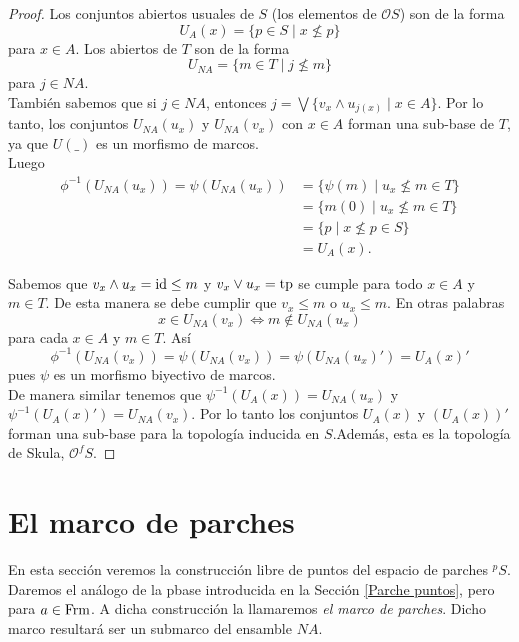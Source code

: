 \begin{proof}
    Los conjuntos abiertos usuales de $S$ (los elementos de $\mathcal{O}S$) son de la forma
    \[
    U_A(x)=\{p\in S\mid x\nleq p\}
    \]
    para $x\in A$. Los abiertos de $T$ son de la forma 
    \[
    U_{NA}=\{m\in T\mid j\nleq m\}
    \]
    para $j\in NA$.\\

    También sabemos que si $j\in NA$, entonces $j=\bigvee\{v_x\wedge u_{j(x)}\mid x\in A\}$. Por lo tanto, los conjuntos $U_{NA}(u_x)$ y $U_{NA}(v_x)$ con $x\in A$ forman una sub-base de $T$, ya que $U( \_ )$ es un morfismo de marcos.\\

    Luego
    \[
    \begin{split}
        \phi^{-1}(U_{NA}(u_x))=\psi (U_{NA}(u_x))&=\{\psi (m)\mid u_x\nleq m \in T\}\\
        &=\{m(0)\mid u_x\nleq m\in T\}\\
        &=\{p\mid x\nleq p\in S\}\\
        &=U_A(x).
    \end{split}
    \]

    Sabemos que $v_x\wedge u_x=\mathrm{id}\leq m$ y $v_x\vee u_x=\mathrm{tp}$ se cumple para todo $x\in A$ y $m\in T$. De esta manera se debe cumplir que $v_x\leq m$ o $u_x\leq m$. En otras palabras
    \[
    x\in U_{NA}(v_x)\Leftrightarrow m\notin U_{NA}(u_x)
    \]
    para cada $x\in A$ y $m\in T$. Así
    \[
    \phi^{-1}(U_{NA}(v_x))=\psi (U_{NA}(v_x))=\psi(U_{NA}(u_x)')=U_A(x)'
    \]
    pues $\psi$ es un morfismo biyectivo de marcos.\\

    De manera similar tenemos que $\psi^{-1}(U_A(x))=U_{NA}(u_x)$ y $\psi^{-1}(U_A(x)')=U_{NA}(v_x)$. Por lo tanto los conjuntos $U_A(x)$ y $(U_A(x))'$ forman una sub-base para la topología inducida en $S$.Además, esta es la topología de Skula, $\mathcal{O}^fS$.
\end{proof}

\section{El marco de parches}\label{Marco de parche}

En esta sección veremos la construcción libre de puntos del espacio de parches $^pS$. Daremos el análogo de la pbase introducida en la Sección \ref{Parche puntos}, pero para $a\in \mathrm{Frm}$. A dicha construcción la llamaremos \emph{el marco de parches}. Dicho marco resultará ser un submarco del ensamble $NA$.\\

